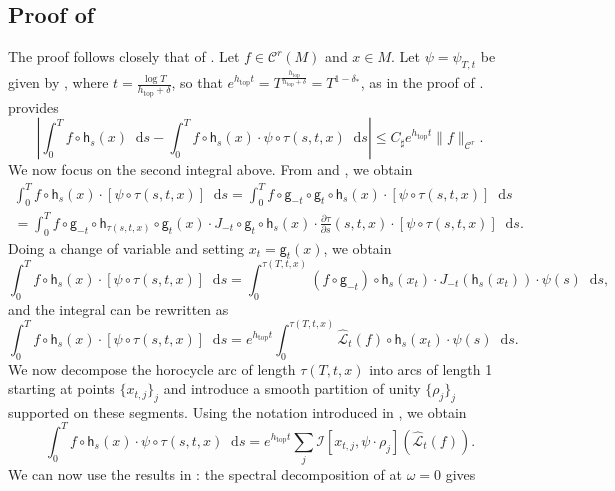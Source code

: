 \documentclass[11pt,letterpaper]{amsart}
\newcommand \cL {{\mathcal L}}
\newcommand \cC {{\mathscr{C}}}
\newcommand \sC {{C_\sharp}}
\newcommand{\horo}{\mathsf{h}}
\newcommand{\geo}{\mathsf{g}}
\newcommand*{\diff}{\mathop{}\!\mathrm{d}}
\DeclareMathOperator{\topp}{top}
\theoremstyle{definition}
\begin{document}
\subsection{Proof of }\label{sec:proofC} 
The proof follows closely that of .
Let $f\in \cC^r(M)$ and $x\in M$. Let $\psi = \psi_{T,t}$ be given by , where $t = \frac{\log T}{h_{\topp} + \delta}$, so that $e^{h_{\topp} t} = T^{\frac{h_{\topp}}{h_{\topp} + \delta}} =  T^{1-\delta_{\ast}}$, as in the proof of .   provides
\begin{equation}\label{eq:power1}
\left\lvert \int_0^T f\circ \horo_s(x)\diff s - \int_{0}^{T} f \circ \horo_s(x) \cdot \psi\circ \tau(s,t,x) \diff s\right\rvert \leq \sC e^{h_{\topp}t} \|f\|_{\cC^r}.
\end{equation}
We now focus on the second integral above.
From  and  , we obtain
\begin{multline*}
\int_0^T f \circ \horo_s(x) \cdot [\psi \circ \tau(s,t,x) ] \diff s = \int_0^T f \circ \geo_{-t}  \circ \geo_{t} \circ \horo_s(x)\cdot [\psi \circ \tau(s,t,x) ] \diff s \\
 = \int_0^T f \circ \geo_{-t} \circ \horo_{\tau(s,t,x)} \circ \geo_{t}(x) \cdot J_{-t} \circ \geo_{t} \circ \horo_s(x) \cdot \frac{\partial \tau}{\partial s}(s,t,x) \cdot [\psi \circ \tau(s,t,x) ] \diff s.
\end{multline*}
Doing a change of variable and setting $x_{t} = \geo_{t}(x)$, we obtain
\[
\int_0^T f \circ \horo_s(x) \cdot [\psi \circ \tau(s,t,x) ] \diff s = \int_{0}^{\tau(T,t,x)} (f \circ \geo_{-t})\circ \horo_s(x_{t}) \cdot J_{-t} (\horo_s (x_{t})) \cdot \psi(s)\diff s,
\]
and the integral can be rewritten as
\[
\int_{0}^{T} f \circ \horo_s(x) \cdot [\psi \circ \tau(s,t,x) ] \diff s = e^{h_{\topp}t} \int_{0}^{\tau(T,t,x)} \hat{ \cL}_{t} (f) \circ \horo_s(x_{t}) \cdot \psi(s) \diff s.
\]
We now decompose the horocycle arc of length $\tau(T,t,x)$ into arcs of length 1 starting at points $\{x_{t,j}\}_j$ and introduce a smooth partition of unity $\{\rho_j\}_j$ supported on these segments. 
Using the notation introduced in , we obtain
\[
\int_{0}^{T} f \circ \horo_s(x) \cdot \psi \circ \tau(s,t,x) \diff s = e^{h_{\topp}t} \sum_j \mathcal{I}[x_{t,j},\psi \cdot \rho_j](\hat{ \cL}_{t} (f)). 
\]
We can now use the results in :
the spectral decomposition of  at $\omega = 0$ gives
\end{document}
